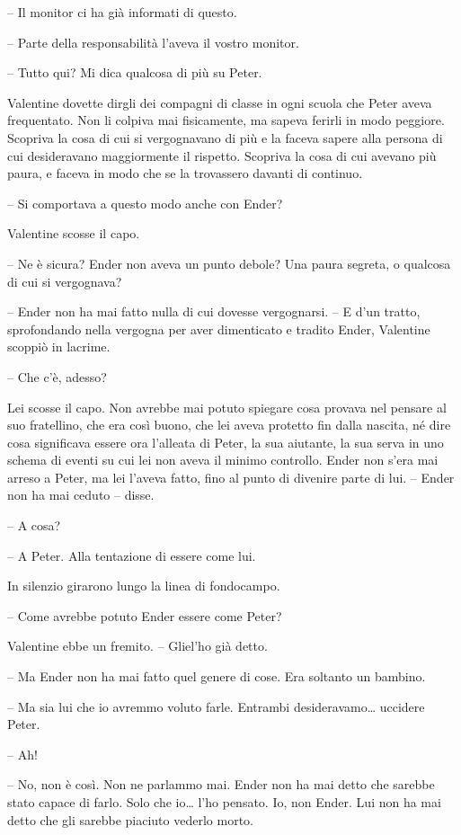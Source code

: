 {-- Il monitor ci ha già informati di questo.}

{-- Parte della responsabilità l'aveva il vostro monitor.}

{-- Tutto qui? Mi dica qualcosa di più su Peter.}

{Valentine dovette dirgli dei compagni di classe in ogni scuola che
	Peter aveva frequentato. Non li colpiva mai fisicamente, ma sapeva
	ferirli in modo peggiore. Scopriva la cosa di cui si vergognavano di più
	e la faceva sapere alla persona di cui desideravano maggiormente il
	rispetto. Scopriva la cosa di cui avevano più paura, e faceva in modo
	che se la trovassero davanti di continuo.}

{-- Si comportava a questo modo anche con Ender?}

{Valentine scosse il capo.}

{-- Ne è sicura? Ender non aveva un punto debole? Una paura segreta, o
	qualcosa di cui si vergognava?}

{-- Ender non ha mai fatto nulla di cui dovesse vergognarsi. -- E d'un
	tratto, sprofondando nella vergogna per aver dimenticato e tradito
	Ender, Valentine scoppiò in lacrime.}

{-- Che c'è, adesso?}

{Lei scosse il capo. Non avrebbe mai potuto spiegare cosa provava nel
	pensare al suo fratellino, che era così buono, che lei aveva protetto
	fin dalla nascita, né dire cosa significava essere ora l'alleata di
	Peter, la sua aiutante, la sua serva in uno schema di eventi su cui lei
	non aveva il minimo controllo. Ender non s'era mai arreso a Peter, ma
	lei l'aveva fatto, fino al punto di divenire parte di lui. -- Ender non
	ha mai ceduto -- disse.}

{-- A cosa?}

{-- A Peter. Alla tentazione di essere come lui.}

{In silenzio girarono lungo la linea di fondocampo.}

{-- Come avrebbe potuto Ender essere come Peter?}

{Valentine ebbe un fremito. -- Gliel'ho già detto.}

{-- Ma Ender non ha mai fatto quel genere di cose. Era soltanto un
	bambino.}

{-- Ma sia lui che io avremmo voluto farle. Entrambi
	desideravamo\ldots{} uccidere Peter.}

{-- Ah!}

{-- No, non è così. Non ne parlammo mai. Ender non ha mai detto che
	sarebbe stato capace di farlo. Solo che io\ldots{} l'ho pensato. Io, non
	Ender. Lui non ha mai detto che gli sarebbe piaciuto vederlo morto.}

